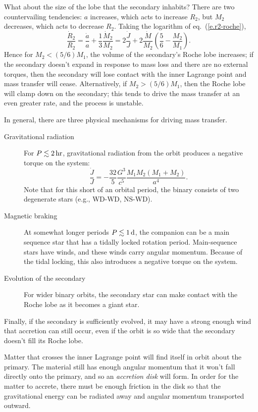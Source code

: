 What about the size of the lobe that the secondary inhabits?  There are two countervailing tendencies: $a$ increases, which acts to increase $R_{2}$, but $M_{2}$ decreases, which acts to decrease $R_{2}$.  Taking the logarithm of eq.~(\ref{e.r2-roche}),
\begin{equation}\label{e.r2dot}
\frac{\dot{R}_{2}}{R_{2}} = \frac{\dot{a}}{a} + \frac{1}{3}\frac{\dot{M}_{2}}{M_{2}} = 2\frac{\dot{J}}{J} + 2\frac{\dot{M}}{M_{2}} \left(\frac{5}{6} - \frac{M_{2}}{M_{1}}\right).
\end{equation}
Hence for $M_{2} < (5/6) M_{1}$, the volume of the secondary's Roche lobe increases; if the secondary doesn't expand in response to mass loss and there are no external torques, then the secondary will lose contact with the inner Lagrange point and mass transfer will cease.  Alternatively, if $M_{2} > (5/6) M_{1}$, then the Roche lobe will clamp down on the secondary; this tends to drive the mass transfer at an even greater rate, and the process is unstable.

In general, there are three physical mechanisms for driving mass transfer.
\begin{description}
\item[Gravitational radiation] For $P \lesssim 2\,\mathrm{hr}$, gravitational radiation from the orbit produces a negative torque on the system:
\begin{equation}\label{e.GR-torque}
\frac{\dot{J}}{J} = -\frac{32}{5}\frac{G^{3}}{c^{5}}\frac{M_{1}M_{2}(M_{1}+M_{2})}{a^{4}}.
\end{equation}
Note that for this short of an orbital period, the binary consists of two degenerate stars (e.g., WD-WD, NS-WD).
\item[Magnetic braking] At somewhat longer periods $P \lesssim 1\,\mathrm{d}$, the companion can be a main sequence star that has a tidally locked rotation period.  Main-sequence stars have winds, and these winds carry angular momentum.  Because of the tidal locking, this also introduces a negative torque on the system.
\item[Evolution of the secondary] For wider binary orbits, the secondary star can make contact with the Roche lobe as it becomes a giant star.
\end{description}
Finally, if the secondary is sufficiently evolved, it may have a strong enough wind that accretion can still occur, even if the orbit is so wide that the secondary doesn't fill its Roche lobe.

Matter that crosses the inner Lagrange point will find itself in orbit about the primary.  The material still has enough angular momentum that it won't fall directly onto the primary, and so an \emph{accretion disk} will form. In order for the matter to accrete, there must be enough friction in the disk so that the gravitational energy can be radiated away and angular momentum transported outward.

